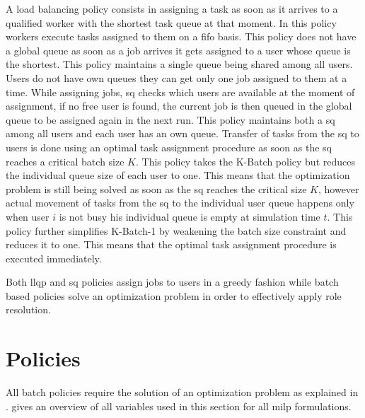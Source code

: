 \begin{enumerate}
	 A load balancing policy consists in assigning a task as soon as it arrives to a qualified worker with the shortest task queue at that moment. In this policy workers execute tasks assigned to them on a \gls{fifo} basis. This policy does not have a global queue \ie as soon as a job arrives it gets assigned to a user whose queue is the shortest.
	 This policy maintains a single queue being shared among all users. Users do not have own queues \ie they can get only one job assigned to them at a time. While assigning jobs, \gls{sq} checks which users are available at the moment of assignment, if no free user is found, the current job is then queued in the global queue to be assigned again in the next run.
	 This policy maintains both a \gls{sq} among all users and each user has an own queue. Transfer of tasks from the \gls{sq} to users is done using an optimal task assignment procedure as soon as the \gls{sq} reaches a critical batch size $K$.
	 This policy takes the K-Batch policy but reduces the individual queue size of each user to one. This means that the optimization problem is still being solved as soon as the \gls{sq} reaches the critical size $K$, however actual movement of tasks from the \gls{sq} to the individual user queue happens only when user $i$ is not busy \ie his individual queue is empty at simulation time $t$.
	 This policy further simplifies K-Batch-1 by weakening the batch size constraint and reduces it to one. This means that the optimal task assignment procedure is executed immediately.
\end{enumerate}

Both \gls{llqp} and \gls{sq} policies assign jobs to users in a greedy fashion while batch based policies solve an optimization problem in order to effectively apply role resolution.

\section{ Policies}
\label{sec:opt_policies}

All batch policies require the solution of an optimization problem as explained in .  gives an overview of all variables used in this section for all \gls{milp} formulations.

